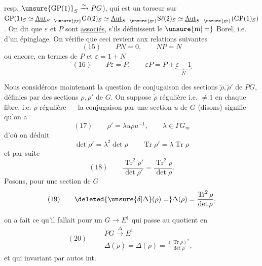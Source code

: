 

resp. $\unsure{\mathrm{GP}(1)}_S\xrightarrow{\sim}PG$),
qui est un torseur sur
$\mathrm{GP}(1)_S\simeq
\underline{\mathrm{Aut}}_{S-\unsure{\mathrm{gr}}}\mathrm{G}\ell(2)_S
\simeq\underline{\mathrm{Aut}}_{S-\unsure{\mathrm{gr}}}\mathrm{S}\ell(2)_S
\simeq\underline{\mathrm{Aut}}_{S-\unsure{\mathrm{gr}}}
(\mathrm{GP}(1)_S)$.
On dit que $\varepsilon$ et $P$ sont
\uline{associés},
s'ils définissent le $\unsure{\overline{\mathrm m}|=}$ Borel,
i.e. 
 d'un épinglage.
On vérifie que ceci revient aux relations suivantes
\[
(15)\qquad PN=0,\qquad NP=N
\]
 ou encore, en termes de $P$ et $\varepsilon=1+N$
\[
(16)\qquad P\varepsilon=P,\qquad
\varepsilon P=P+\underbrace{\varepsilon-1}_{N}
\]

Nous considérons maintenant la question de
 conjugaison des sections
$\widetilde\rho,\widetilde\rho'$ de $PG$,
définies par des sections $\rho,\rho'$ de $G$.
On suppose $\widetilde\rho$ régulière i.e. $\ne1$ en
chaque  fibre, i.e. $\rho$ régulière —
 la conjugaison
par une section $u$ de $G$ (disons) signifie qu'on a
\[
(17)\qquad \rho'=\lambda u\rho u^{-1},\qquad
\lambda\in\Gamma G_m
\]
d'où on déduit
\[
\det\rho'=\lambda^2\det\rho\qquad
\operatorname{Tr}\rho'=\lambda\operatorname{Tr}\rho
\]
et par suite
\[
(18)\qquad
\frac{\operatorname{Tr}^2\rho'}{\det\rho'}
=\frac{\operatorname{Tr}^2\rho}{\det\rho}.
\]
Posons, pour une section de $G$
\[
(19)\qquad
\deleted{\unsure{\delta|\Delta}(\rho)=}
\Delta(\rho)=\frac{\operatorname{Tr}^2\rho}{\det\rho},
\]



on a fait ce qu'il fallait pour 
 un $G\longrightarrow E^1$ qui passe au
quotient en
\[
(20)\qquad
\begin{gathered}
PG\xrightarrow{\Delta}E^1\\
\Delta(\widetilde\rho)=\Delta(\rho)
=\frac{(\operatorname{Tr}\rho)^2}{\det\rho},
\end{gathered}
\]
et qui  invariant par autos int.

